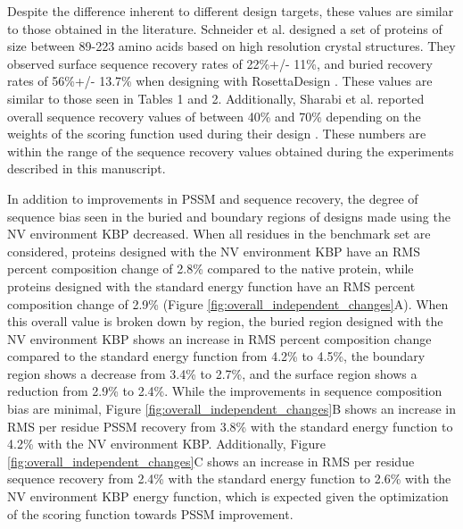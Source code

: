 Despite the difference inherent to different design targets, these values are similar to those obtained in the literature.
Schneider et al. designed a set of proteins of size between 89-223 amino acids based on high resolution crystal structures.
They observed surface sequence recovery rates of 22\%+/- 11\%, and buried recovery rates of 56\%+/- 13.7\% when designing with RosettaDesign \citep{Schneider:2009ig}.
These values are similar to those seen in Tables 1 and 2.
Additionally, Sharabi et al. reported overall sequence recovery values of between 40\% and 70\% depending on the weights of the scoring function used during their design \citep{Sharabi:2011ev}.
These numbers are within the range of the sequence recovery values obtained during the experiments described in this manuscript.

In addition to improvements in PSSM and sequence recovery, the degree of sequence bias seen in the buried and boundary regions of designs made using the NV environment KBP decreased.
When all residues in the benchmark set are considered, proteins designed with the NV environment KBP have an RMS percent composition change of 2.8\% compared to the native protein, while proteins designed with the standard energy function have an RMS percent composition change of 2.9\% (Figure \ref{fig:overall_independent_changes}A).
When this overall value is broken down by region, the buried region designed with the NV environment KBP shows an increase in RMS percent composition change compared to the standard energy function from 4.2\% to 4.5\%, the boundary region shows a decrease from 3.4\% to 2.7\%, and the surface region shows a reduction from 2.9\% to 2.4\%.
While the improvements in sequence composition bias are minimal, Figure \ref{fig:overall_independent_changes}B shows an increase in RMS per residue PSSM recovery from 3.8\% with the standard energy function to 4.2\% with the NV environment KBP.
Additionally, Figure \ref{fig:overall_independent_changes}C shows an increase in RMS per residue sequence recovery from 2.4\% with the standard energy function to 2.6\% with the NV environment KBP energy function, which is expected given the optimization of the scoring function towards PSSM improvement. 

